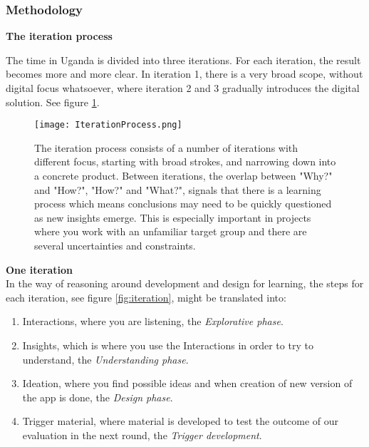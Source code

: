 \subsubsection{Methodology}

\textbf{The iteration process}

The time in Uganda is divided into three iterations. For each iteration, the result becomes more and more clear. In iteration 1, there is a very broad scope, without digital focus whatsoever, where iteration 2 and 3 gradually introduces the digital solution. See figure \ref{fig:iterationprocess}.


\begin{figure}[h]
    \centering
    \texttt{[image: IterationProcess.png]}
    \caption{The iteration process consists of a number of iterations with different focus, starting with broad strokes, and narrowing down into a concrete product. Between iterations, the overlap between "Why?" and "How?", "How?" and "What?", signals that there is a learning process which means conclusions may need to be quickly questioned as new insights emerge. This is especially important in projects where you work with an unfamiliar target group and there are several uncertainties and constraints.}
    \label{fig:iterationprocess}
\end{figure}

\textbf{One iteration} \\
In the way of reasoning around development and design for learning, the steps for each iteration, see figure \ref{fig:iteration}, might be translated into:

\begin{enumerate}
\item Interactions, where you are listening, the \textit{Explorative phase}. 
\item Insights, which is where you use the Interactions in order to try to understand, the \textit{Understanding phase}. %
\item Ideation, where you find possible ideas and when creation of new version of the app is done, the \textit{Design phase}.
\item Trigger material, where material is developed to test the outcome of our evaluation in the next round, the \textit{Trigger development}.
\end{enumerate}
